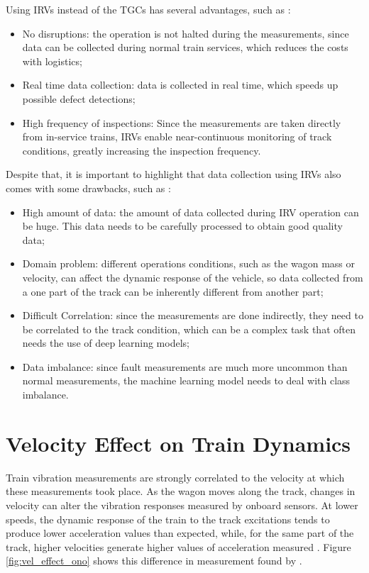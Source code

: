 Using IRVs instead of the TGCs has several advantages, such as \cite{PIRES2024107191,GHIASI2025109516,Hironori_ONO202322-00239}:
\begin{itemize}
    \item No disruptions: the operation is not halted during the measurements, since data can be collected during normal train services, which reduces the costs with logistics;
    \item Real time data collection: data is collected in real time, which speeds up possible defect detections;
    \item High frequency of inspections: Since the measurements are taken directly from in-service trains, IRVs enable near-continuous monitoring of track conditions, greatly increasing the inspection frequency.
\end{itemize}

Despite that, it is important to highlight that data collection using IRVs also comes with some drawbacks, such as \cite{PIRES2024107191,GHIASI2025109516}:
\begin{itemize}
    \item High amount of data: the amount of data collected during IRV operation can be huge. This data needs to be carefully processed to obtain good quality data;
    \item Domain problem: different operations conditions, such as the wagon mass or velocity, can affect the dynamic response of the vehicle, so data collected from a one part of the track can be inherently different from another part;
    \item Difficult Correlation: since the measurements are done indirectly, they need to be correlated to the track condition, which can be a complex task that often needs the use of deep learning models;
    \item Data imbalance: since fault measurements are much more uncommon than normal measurements, the machine learning model needs to deal with class imbalance.
\end{itemize}

\section{Velocity Effect on Train Dynamics} \label{sec-vel-effect-measurement}

Train vibration measurements are strongly correlated to the velocity at which these measurements took place. As the wagon moves along the track, changes in velocity can alter the vibration responses measured by onboard sensors. At lower speeds, the dynamic response of the train to the track excitations tends to produce lower acceleration values than expected, while, for the same part of the track, higher velocities generate higher values of acceleration measured \cite{Hironori_ONO202322-00239}. Figure \ref{fig:vel_effect_ono} shows this difference in measurement found by \cite{Hironori_ONO202322-00239}. 


